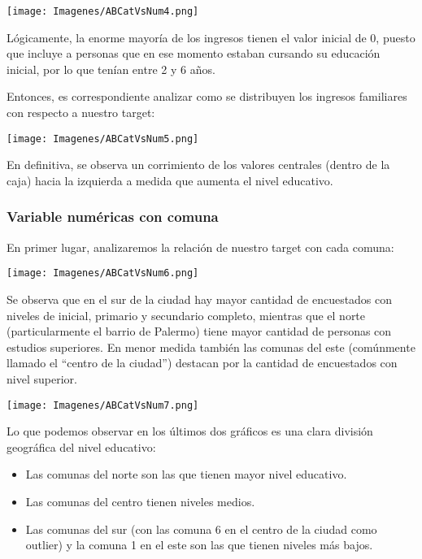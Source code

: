 \documentclass[a4paper]{article}
\begin{document}
            \begin{center}
                \texttt{[image: Imagenes/ABCatVsNum4.png]}
            \end{center}
 
            Lógicamente, la enorme mayoría de los ingresos tienen el valor inicial de 0, puesto que incluye a personas que en ese momento estaban cursando su educación inicial, por lo que tenían entre 2 y 6 años.

            Entonces, es correspondiente analizar como se distribuyen los ingresos familiares con respecto a nuestro target:
 
            \begin{center}
                \texttt{[image: Imagenes/ABCatVsNum5.png]}
            \end{center}
 
            En definitiva, se observa un corrimiento de los valores centrales (dentro de la caja) hacia la izquierda a medida que aumenta el nivel educativo.

        \newpage
 
        \subsubsection{Variable numéricas con comuna}

            En primer lugar, analizaremos la relación de nuestro target con cada comuna: 
 
            \begin{center}
                \texttt{[image: Imagenes/ABCatVsNum6.png]}
            \end{center}
 
            Se observa que en el sur de la ciudad hay  mayor cantidad de encuestados con niveles de inicial, primario y secundario completo, mientras que el norte (particularmente el barrio de Palermo) tiene mayor cantidad de personas con estudios superiores. En menor medida también las comunas del este (comúnmente llamado el ``centro de la ciudad'') destacan por la cantidad de encuestados con nivel superior.

            \begin{center}
                \texttt{[image: Imagenes/ABCatVsNum7.png]}
            \end{center}
 
            Lo que podemos observar en los últimos dos gráficos es una clara división geográfica del nivel educativo:
            \begin{itemize}
                \item Las comunas del norte son las que tienen mayor nivel educativo.
                \item Las comunas del centro tienen niveles medios.
                \item Las comunas del sur (con las comuna 6 en el centro de la ciudad como outlier) y la comuna 1 en el este son las que tienen niveles más bajos.
            \end{itemize}
    
\end{document}
